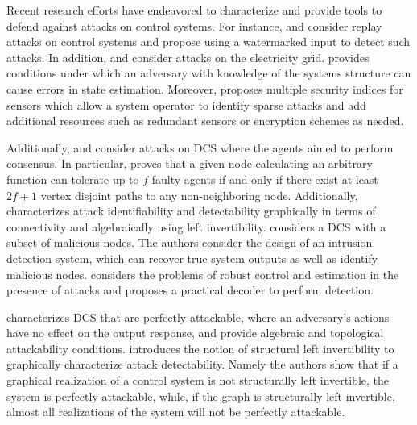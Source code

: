 \documentclass[letterpaper, 10 pt, conference]{ieeeconf}
\begin{document}
Recent research efforts have endeavored to characterize and provide tools to defend against attacks on control systems. For instance, \cite{Mo2014} and \cite{Mo2009R} consider replay attacks on control systems and propose using a watermarked input to detect such attacks. In addition, \cite{liu2009} and \cite{henrik2010} consider attacks on the electricity grid.  \cite{liu2009}  provides conditions under which an adversary with knowledge of the systems structure can cause errors in state estimation. Moreover, \cite{henrik2010} proposes multiple security indices for sensors which allow a system operator to identify sparse attacks and add additional resources such as redundant sensors or encryption schemes as needed. 

Additionally, \cite{PasqualettiConsensusUnreliable} and \cite{Sundaram_function} consider attacks on DCS where the agents aimed to perform consensus. In particular, \cite{Sundaram_function}  proves that a given node calculating an arbitrary function can tolerate up to $f$ faulty agents if and only if there exist at least $2f +1$ vertex disjoint paths to any non-neighboring node. Additionally, \cite{PasqualettiConsensusUnreliable} characterizes attack identifiability and detectability graphically in terms of connectivity and algebraically using left invertibility.  \cite{wirelesscontrol} considers a DCS with a subset of malicious nodes.  The authors consider the design of an intrusion detection system, which can recover true system outputs as well as identify malicious nodes. \cite{Fawzi_secure_cont_est} considers the problems of robust control and estimation in the presence of attacks and proposes a practical decoder to perform detection.

\cite{Cam2014}  characterizes DCS that are perfectly attackable, where an adversary's actions have no effect on the output response, and provide algebraic and topological attackability conditions. \cite{PasqualettiAttack} introduces the notion of structural left invertibility to graphically characterize attack detectability. Namely the authors show that if a graphical realization of a control system is not structurally left invertible, the system is perfectly attackable, while, if the graph is structurally left invertible, almost all realizations of the system will not be perfectly attackable. 
\end{document}
